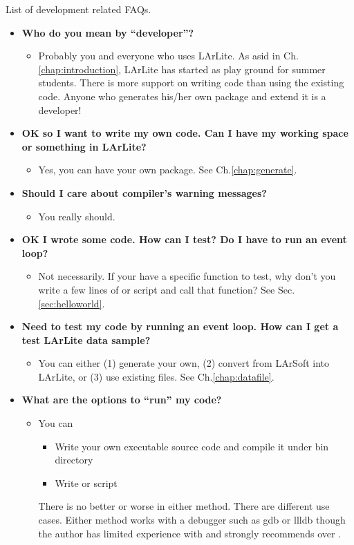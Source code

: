 List of development related FAQs.

\begin{itemize}

\item[] {\bf Who do you mean by ``developer''?}
  \begin{itemize}
    \item Probably you and everyone who uses LArLite. As asid in Ch.\ref{chap:introduction}, LArLite has started as \CPP play ground for summer students. There is more support on writing code than using the existing code. Anyone who generates his/her own package and extend it is a developer!
  \end{itemize}

\item[] {\bf OK so I want to write my own code. Can I have my working space or something in LArLite?}
  \begin{itemize}
    \item Yes, you can have your own package. See Ch.\ref{chap:generate}.
  \end{itemize}

\item[] {\bf Should I care about compiler's warning messages?}
  \begin{itemize}
    \item You really should.
  \end{itemize}

\item[] {\bf OK I wrote some code. How can I test? Do I have to run an event loop?}
  \begin{itemize}
    \item Not necessarily. If your have a specific function to test, why don't you write a few lines of \PyROOT or \CINT script and call that function? See Sec.\ref{sec:helloworld}.
  \end{itemize}

\item[] {\bf Need to test my code by running an event loop. How can I get a test LArLite data sample?}
  \begin{itemize}
    \item You can either (1) generate your own, (2) convert from LArSoft into LArLite, or (3) use existing files. See Ch.\ref{chap:datafile}.
  \end{itemize}

\item[] {\bf What are the options to ``run'' my code? }
  \begin{itemize}
    \item You can 
      \begin{itemize}
        \item Write your own executable source code and compile it under {\ttfamily bin} directory
        \item Write \CINT or \PyROOT script
      \end{itemize}
      There is no better or worse in either method. There are different use cases. Either method works with a debugger such as {\ttfamily gdb} or {\ttfamily llldb} though the author has limited experience with \CINT and strongly recommends \PyROOT over \CINT.
  \end{itemize}


\end{itemize}
